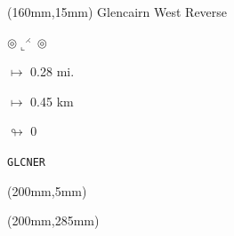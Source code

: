 \begin{textblock*}{40mm}(160mm,15mm)%
Glencairn West Reverse
\par $\circledcirc\llcorner^{\rightthreetimes}\circledcirc$
\Large
\par$\mapsto$ 0.28 mi.
\par$\mapsto$ 0.45 km
\par$\looparrowright$ 0
\par\hfill\tiny\tt GLCNER\\
\end{textblock*}
\begin{textblock*}{20mm}(200mm,5mm)%
\fbox{\thepage}
\end{textblock*}
\begin{textblock*}{20mm}(200mm,285mm)%
\fbox{\thepage}
\end{textblock*}
\null\newpage

